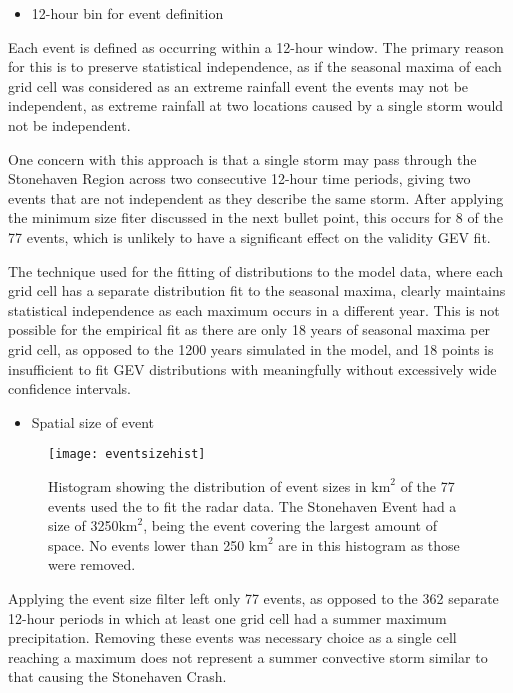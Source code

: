 \begin{itemize}\item 12-hour bin for event definition\end{itemize}

Each event is defined as occurring within a 12-hour window.
The primary reason for this is to preserve statistical independence,
    as if the seasonal maxima of each grid cell was considered as an extreme rainfall event
    the events may not be independent,
    as extreme rainfall at two locations caused by a single storm would not be independent.

One concern with this approach is that a single storm may pass through the Stonehaven Region
    across two consecutive 12-hour time periods,
    giving two events that are not independent as they describe the same storm.
After applying the minimum size fiter discussed in the next bullet point,
    this occurs for 8 of the 77 events,
    which is unlikely to have a significant effect on the validity GEV fit.

The technique used for the fitting of distributions to the model data,
    where each grid cell has a separate distribution fit to the seasonal maxima,
    clearly maintains statistical independence as each maximum occurs in a different year.
This is not possible for the empirical fit as there are only 18 years of seasonal maxima per grid cell,
    as opposed to the 1200 years simulated in the model,
    and 18 points is insufficient to fit GEV distributions with meaningfully without excessively wide confidence intervals.

\begin{itemize}\item Spatial size of event\end{itemize}

\begin{figure}[H]
    \centering
    \texttt{[image: eventsizehist]}
    \caption[Histogram showing the distribution of event sizes.]{
        Histogram showing the distribution of event sizes in $\text{km}^2$ of the 77 events used the to fit the radar data.
    The Stonehaven Event had a size of 3250$\text{km}^2$,
        being the event covering the largest amount of space.
    No events lower than 250 $\text{km}^2$ are in this histogram as those were removed.}
    \label{fig:eventsizehist}
\end{figure}

Applying the event size filter left only 77 events, as opposed to the 362 separate 12-hour periods in which at least one grid cell had a summer maximum precipitation.
Removing these events was necessary choice as a single cell reaching a maximum does not represent a summer convective storm similar to that causing the Stonehaven Crash.

